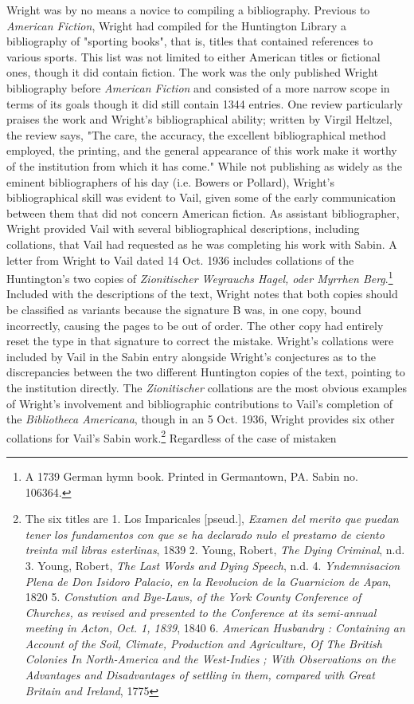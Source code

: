 Wright was by no means a novice to compiling a bibliography. Previous to \textit{American Fiction}, Wright had compiled for the Huntington Library a bibliography of "sporting books", that is, titles that contained references to various sports.\autocite{wright_sporting_1937} This list was not limited to either American titles or fictional ones, though it did contain fiction. The work was the only published Wright bibliography before \textit{American Fiction} and consisted of a more narrow scope in terms of its goals though it did still contain 1344 entries. One review particularly praises the work and Wright's bibliographical ability; written by Virgil Heltzel, the review says, "The care, the accuracy, the excellent bibliographical method employed, the printing, and the general appearance of this work make it worthy of the institution from which it has come."\autocite{heltzel_review_1938} While not publishing as widely as the eminent bibliographers of his day (i.e. Bowers or Pollard), Wright's bibliographical skill was evident to Vail, given some of the early communication between them that did not concern American fiction. As assistant bibliographer, Wright provided Vail with several bibliographical descriptions, including collations, that Vail had requested as he was completing his work with Sabin. A letter from Wright to Vail dated 14 Oct. 1936 includes collations of the Huntington's two copies of \textit{Zionitischer Weyrauchs Hagel, oder Myrrhen Berg}.\footnote{A 1739 German hymn book. Printed in Germantown, PA. Sabin no. 106364.} Included with the descriptions of the text, Wright notes that both copies should be classified as variants because the signature B was, in one copy, bound incorrectly, causing the pages to be out of order. The other copy had entirely reset the type in that signature to correct the mistake.\autocite{lyle_h._wright_letter_1936-3} Wright's collations were included by Vail in the Sabin entry alongside Wright's conjectures as to the discrepancies between the two different Huntington copies of the text, pointing to the institution directly.\autocite{sabin_bibliotheca_1936} The \textit{Zionitischer} collations are the most obvious examples of Wright's involvement and bibliographic contributions to Vail's completion of the \textit{Bibliotheca Americana}, though in an 5 Oct. 1936, Wright provides six other collations for Vail's Sabin work.\footnote{The six titles are 1. Los Imparicales [pseud.], \textit{Examen del merito que puedan tener los fundamentos con que se ha declarado nulo el prestamo de ciento treinta mil libras esterlinas}, 1839 2. Young, Robert, \textit{The Dying Criminal}, n.d. 3. Young, Robert, \textit{The Last Words and Dying Speech}, n.d. 4. \textit{Yndemnisacion Plena de Don Isidoro Palacio, en la Revolucion de la Guarnicion de Apan}, 1820 5. \textit{Constution and Bye-Laws, of the York County Conference of Churches, as revised and presented to the Conference at its semi-annual meeting in Acton, Oct. 1, 1839}, 1840 6. \textit{American Husbandry : Containing an Account of the Soil, Climate, Production and Agriculture, Of The British Colonies In North-America and the West-Indies ; With Observations on the Advantages and Disadvantages of settling in them, compared with Great Britain and Ireland}, 1775} Regardless of the case of mistaken 